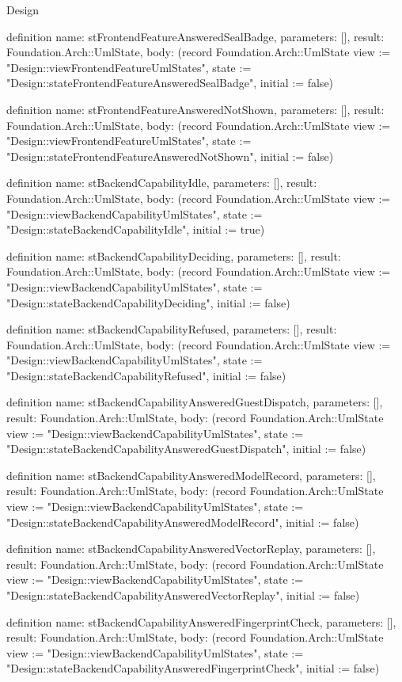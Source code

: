 \begin{lexlean}{Design}
\begin{semanticmodule}
definition{
  name: stFrontendFeatureAnsweredSealBadge,
  parameters: [],
  result: Foundation.Arch::UmlState,
  body: (record Foundation.Arch::UmlState {view := "Design::viewFrontendFeatureUmlStates", state := "Design::stateFrontendFeatureAnsweredSealBadge", initial := false})
}

definition{
  name: stFrontendFeatureAnsweredNotShown,
  parameters: [],
  result: Foundation.Arch::UmlState,
  body: (record Foundation.Arch::UmlState {view := "Design::viewFrontendFeatureUmlStates", state := "Design::stateFrontendFeatureAnsweredNotShown", initial := false})
}

definition{
  name: stBackendCapabilityIdle,
  parameters: [],
  result: Foundation.Arch::UmlState,
  body: (record Foundation.Arch::UmlState {view := "Design::viewBackendCapabilityUmlStates", state := "Design::stateBackendCapabilityIdle", initial := true})
}

definition{
  name: stBackendCapabilityDeciding,
  parameters: [],
  result: Foundation.Arch::UmlState,
  body: (record Foundation.Arch::UmlState {view := "Design::viewBackendCapabilityUmlStates", state := "Design::stateBackendCapabilityDeciding", initial := false})
}

definition{
  name: stBackendCapabilityRefused,
  parameters: [],
  result: Foundation.Arch::UmlState,
  body: (record Foundation.Arch::UmlState {view := "Design::viewBackendCapabilityUmlStates", state := "Design::stateBackendCapabilityRefused", initial := false})
}

definition{
  name: stBackendCapabilityAnsweredGuestDispatch,
  parameters: [],
  result: Foundation.Arch::UmlState,
  body: (record Foundation.Arch::UmlState {view := "Design::viewBackendCapabilityUmlStates", state := "Design::stateBackendCapabilityAnsweredGuestDispatch", initial := false})
}

definition{
  name: stBackendCapabilityAnsweredModelRecord,
  parameters: [],
  result: Foundation.Arch::UmlState,
  body: (record Foundation.Arch::UmlState {view := "Design::viewBackendCapabilityUmlStates", state := "Design::stateBackendCapabilityAnsweredModelRecord", initial := false})
}

definition{
  name: stBackendCapabilityAnsweredVectorReplay,
  parameters: [],
  result: Foundation.Arch::UmlState,
  body: (record Foundation.Arch::UmlState {view := "Design::viewBackendCapabilityUmlStates", state := "Design::stateBackendCapabilityAnsweredVectorReplay", initial := false})
}

definition{
  name: stBackendCapabilityAnsweredFingerprintCheck,
  parameters: [],
  result: Foundation.Arch::UmlState,
  body: (record Foundation.Arch::UmlState {view := "Design::viewBackendCapabilityUmlStates", state := "Design::stateBackendCapabilityAnsweredFingerprintCheck", initial := false})
}


\end{semanticmodule}
\end{lexlean}
